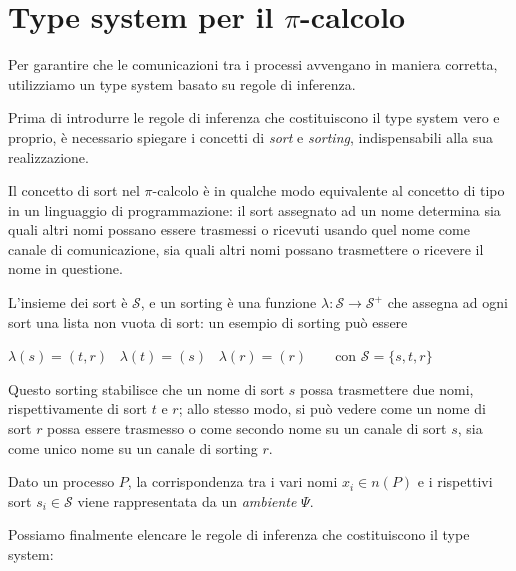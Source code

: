 \section{Type system per il \texorpdfstring{$\pi$}{pi}-calcolo}

Per garantire che le comunicazioni tra i processi avvengano in maniera
corretta, utilizziamo un type system basato su regole di
inferenza\cite{qw05}.

Prima di introdurre le regole di inferenza che costituiscono il type system
vero e proprio, \`e necessario spiegare i concetti di \emph{sort} e
\emph{sorting}, indispensabili alla sua realizzazione.

Il concetto di sort nel $\pi$-calcolo \`e in qualche modo equivalente al
concetto di tipo in un linguaggio di programmazione: il sort assegnato ad un
nome determina sia quali altri nomi possano essere trasmessi o ricevuti usando
quel nome come canale di comunicazione, sia quali altri nomi possano
trasmettere o ricevere il nome in questione.

L'insieme dei sort \`e $\mathcal{S}$, e un sorting \`e una funzione
$\lambda : \mathcal{S} \rightarrow \mathcal{S}^{+}$ che assegna ad ogni sort
una lista non vuota di sort: un esempio di sorting pu\`o essere

\begin{pilisting}
$
    \lambda(s) = (t,r) \;\;\;
    \lambda(t) = (s)   \;\;\;
    \lambda(r) = (r)   \;\;\;\;\;\;
$
con $\mathcal{S} = \{s,t,r\}$
\end{pilisting}

Questo sorting stabilisce che un nome di sort $s$ possa trasmettere due
nomi, rispettivamente di sort $t$ e $r$; allo stesso modo, si pu\`o vedere
come un nome di sort $r$ possa essere trasmesso o come secondo nome su un
canale di sort $s$, sia come unico nome su un canale di sorting $r$.

Dato un processo $P$, la corrispondenza tra i vari nomi $x_i \in n(P)$ e
i rispettivi sort $s_i \in \mathcal{S}$ viene rappresentata da un
\emph{ambiente} $\Psi$.

Possiamo finalmente elencare le regole di inferenza che costituiscono il
type system:

